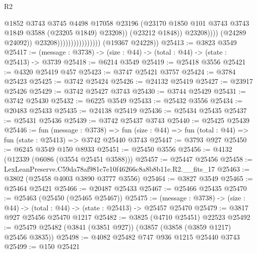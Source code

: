\begin{lexlean}{R2}
\begin{coremodule}
                                                    @1852
                                                    @3743
                                                    @3745
                                                    @4498
                                                    @17058
                                                    @23196
                                                    (@23170
                                                      @1850
                                                      @101
                                                      @3743
                                                      @3743
                                                      @1849
                                                      @3588
                                                      (@23205 @1849)
                                                      @23208))
                                                  (@23212 @1848))
                                                @23208))))
                                        (@24289 @24092))
                                      @23208))))))))))))))))
      (@19367 @24228))
@25413 := @3823 @3549
@25417 := (message : @3738) -> (size : @44) -> (total : @44) -> (state : @25413) -> @3739
@25418 := @6214 @3549
@25419 := @25418 @3556
@25421 := @4320 @25419 @457
@25423 := @3747 @25421 @3757
@25424 := @3784 @25423
@25425 := @3742 @25424
@25426 := @24132 @25419
@25427 := @23917 @25426
@25429 := @3742 @25427 @3743
@25430 := @3744 @25429
@25431 := @3742 @25430
@25432 := @6225 @3549
@25433 := @25432 @3556
@25434 := @20483 @25433
@25435 := @24138 @25419
@25436 := @25434 @25435
@25437 := @25431 @25436
@25439 := @3742 @25437 @3743
@25440 := @25425 @25439
@25446 := fun (message : @3738) =>
  fun (size : @44) => fun (total : @44) => fun (state : @25413) => @3742 @25440 @3743
@25447 := @3793 @927
@25450 := @6245 @3549 @150 @8933
@25451 := @25450 @3556
@25456 := @4132 (@12339 (@6086 (@3554 @25451 @3588)))
@25457 := @25447 @25456
@25458 := LexLeanPreserve.C59da78af981c7e10f46266c8a8b8b11e.R2.__fits_17
@25463 := @3802 (@25458 @4003 @3890 @3777 @3556)
@25464 := @3827 @3549
@25465 := @25464 @25421
@25466 := @20487 @25433
@25467 := @25466 @25435
@25470 := @25463 (@25450 (@25465 @25467))
@25475 := (message : @3738) -> (size : @44) -> (total : @44) -> (state : @25413) -> @25457 @25470
@25479 := @3817 @927 @25456 @25470 @1217
@25482 := @3825 (@4710 @25451) @22523
@25492 := @25479 @25482 (@3841 (@3851 @927)) (@3857 (@3858 (@3859 @1217) @25456 @3835))
@25498 := @4082 @25482 @747 @936 @1215 @25440 @3743
@25499 := @150 @25421

\end{coremodule}
\end{lexlean}
